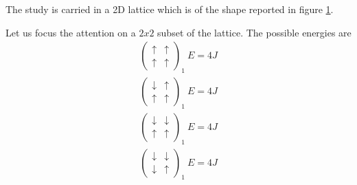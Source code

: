 The study is carried in a 2D lattice which is of the shape reported in figure \ref{fig:IsingLattice}.
\begin{figure}[htbp]
    \centering
    \caption{}
    \label{fig:IsingLattice}
\end{figure}
Let us focus the attention on a $2x2$ subset of the lattice. The possible energies are 
\begin{align*}
    \begin{pmatrix} \uparrow & \uparrow \\ \uparrow & \uparrow \end{pmatrix}_1 \ E = 4J \\
    \begin{pmatrix} \downarrow & \uparrow \\ \uparrow & \uparrow \end{pmatrix}_1 \ E = 4J \\
    \begin{pmatrix} \downarrow & \downarrow \\ \uparrow & \uparrow \end{pmatrix}_1 \ E = 4J \\
    \begin{pmatrix} \downarrow & \downarrow \\ \downarrow & \uparrow \end{pmatrix}_1 \ E = 4J
\end{align*}
